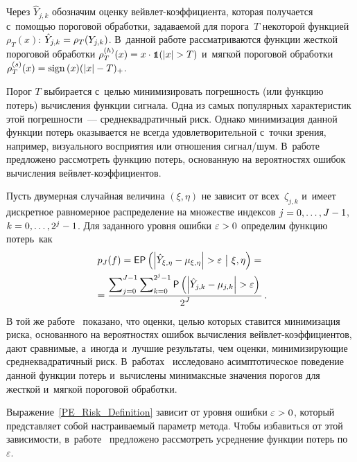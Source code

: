 \begin{multicols}{2}
Через $\hat{Y}_{j,k}$ обозначим оценку вейв\-лет-ко\-эф\-фи\-ци\-ен\-та, 
которая получается с~по\-мощью пороговой обработки, задаваемой для порога~$T$ некоторой функцией 
$\rho_T(x)$: $\hat{Y}_{j,k}\hm=\rho_T(Y_{j,k})$. В~данной работе рассматриваются 
функции жесткой пороговой обработки $\rho_T^{(h)}(x)\hm=x \cdot \Ik (|x|\hm>T)$ 
и~мягкой пороговой обработки $\rho_T^{(s)}(x)\hm=\mathrm{sign}\,(x)(|x|\hm-T)_+$.

Порог $T$ выбирается с~целью минимизировать погрешность 
(или функцию потерь) вычисления функции сигнала. Одна из самых популярных 
характеристик этой погрешности~--- сред\-не\-квад\-ра\-тич\-ный риск. 
Однако минимизация данной функции потерь оказывается не всегда удовлетворительной с~точки зрения, 
например, визуального восприятия или отношения сиг\-нал/шум. 
В~работе~\cite{SMS14} предложено рассмотреть функцию потерь, 
основанную на вероятностях ошибок вычисления вейв\-лет-ко\-эф\-фи\-ци\-ен\-тов. 

Пусть двумерная случайная величина $(\xi,\eta)$ не зависит от всех~$\zeta_{j,k}$ 
и~имеет дискретное равномерное распределение на множестве индексов $j\hm=0,\ldots,J\hm-1$,
$k\hm=0,\ldots,2^j-1$. Для заданного уровня ошибки $\varepsilon\hm>0$ определим функцию по\-терь~как
\begin{multline}
p_J(f)=\e\p\left(\left|\hat{Y}_{\xi,\eta}-\mu_{\xi,\eta}\right|>
\varepsilon\ \big|\ \xi,\eta\right)={}\\
{}=
\fr{\sum\nolimits_{j=0}^{J-1}\sum\nolimits_{k=0}^{2^j-1} \p\left(\left|\hat{Y}_{j,k}-
\mu_{j,k}\right|>\varepsilon\right)}{2^J}\,.
\label{PE_Risk_Definition}
\end{multline}
В той же работе~\cite{SMS14} показано, что оцен\-ки, \mbox{целью} которых ставится минимизация риска,
 основанного на вероятностях ошибок вы\-чис\-ле\-ния вейв\-лет-ко\-эф\-фи\-ци\-ен\-тов, 
 дают сравнимые, а~иногда и~лучшие результаты, чем оценки, ми\-ни\-ми\-зи\-ру\-ющие сред\-не\-квад\-ра\-тич\-ный риск. 
 В~работах~\cite{KS16-1, KS16-2} исследовано асимптотическое поведение данной функции потерь 
 и~вычислены минимаксные значения порогов для жест\-кой и~мяг\-кой пороговой об\-ра\-ботки.

Выражение~\eqref{PE_Risk_Definition} зависит от уров\-ня ошиб\-ки $\varepsilon\hm>0$, который 
пред\-став\-ля\-ет собой на\-стра\-и\-ва\-емый параметр метода. Чтобы избавиться от этой за\-ви\-си\-мости,
 в~работе~\cite{SMS20} предложено рас\-смот\-реть усред\-не\-ние функции потерь по~$\varepsilon$. 
 

\end{multicols}
